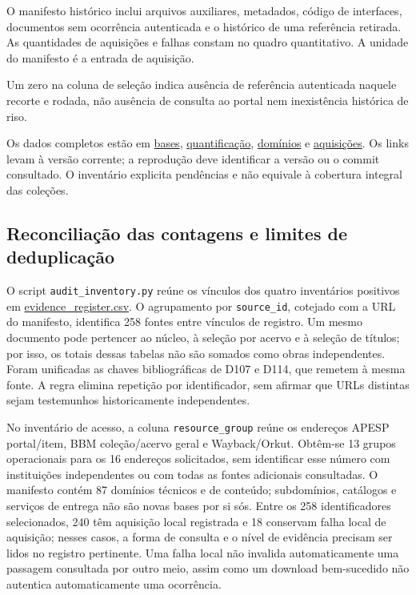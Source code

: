 O manifesto histórico inclui arquivos auxiliares, metadados, código de interfaces, documentos sem ocorrência autenticada e o histórico de uma referência retirada. As quantidades de aquisições e falhas constam no quadro quantitativo. A unidade do manifesto é a entrada de aquisição.




Um zero na coluna de seleção indica ausência de referência autenticada naquele recorte e rodada, não ausência de consulta ao portal nem inexistência histórica de riso.

Os dados completos estão em \href{https://github.com/murilloed/historia-riso-escrito-portugues/blob/main/data/base_registry.csv}{bases}, \href{https://github.com/murilloed/historia-riso-escrito-portugues/blob/main/data/method_quantification.csv}{quantificação}, \href{https://github.com/murilloed/historia-riso-escrito-portugues/blob/main/data/source_domains.csv}{domínios} e \href{https://github.com/murilloed/historia-riso-escrito-portugues/blob/main/data/downloads.json}{aquisições}. Os links levam à versão corrente; a reprodução deve identificar a versão ou o commit consultado. O inventário explicita pendências e não equivale à cobertura integral das coleções.

\subsection{Reconciliação das contagens e limites de deduplicação}

O script \nolinkurl{audit_inventory.py} reúne os vínculos dos quatro inventários positivos em \href{https://github.com/murilloed/historia-riso-escrito-portugues/blob/main/data/evidence_register.csv}{evidence\_register.csv}. O agrupamento por \texttt{source\_id}, cotejado com a URL do manifesto, identifica 258 fontes entre \EvidenceMemberships{} vínculos de registro. Um mesmo documento pode pertencer ao núcleo, à seleção por acervo e à seleção de títulos; por isso, os totais dessas tabelas não são somados como obras independentes. Foram unificadas as chaves bibliográficas de D107 e D114, que remetem à mesma fonte. A regra elimina repetição por identificador, sem afirmar que URLs distintas sejam testemunhos historicamente independentes.

No inventário de acesso, a coluna \texttt{resource\_group} reúne os endereços APESP portal/item, BBM coleção/acervo geral e Wayback/Orkut. Obtêm-se 13 grupos operacionais para os 16 endereços solicitados, sem identificar esse número com instituições independentes ou com todas as fontes adicionais consultadas. O manifesto contém 87 domínios técnicos e de conteúdo; subdomínios, catálogos e serviços de entrega não são novas bases por si sós. Entre os 258 identificadores selecionados, 240 têm aquisição local registrada e 18 conservam falha local de aquisição; nesses casos, a forma de consulta e o nível de evidência precisam ser lidos no registro pertinente. Uma falha local não invalida automaticamente uma passagem consultada por outro meio, assim como um download bem-sucedido não autentica automaticamente uma ocorrência.


